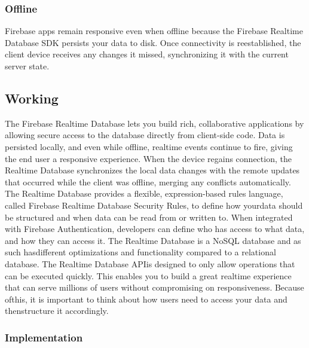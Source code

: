 \subsubsection{Offline}
Firebase apps remain responsive even when offline because the Firebase Realtime Database SDK persists your data to disk. Once connectivity is reestablished, the client device receives any changes it missed, synchronizing it with the current server state.

\subsection{Working}
The Firebase Realtime Database lets you build rich, collaborative applications by allowing secure access to the database directly from client-side code. Data is persisted locally, and even while offline, realtime events continue to fire, giving the end user a responsive experience. When the device regains connection, the Realtime Database synchronizes the local data changes with the remote updates that occurred while the client was offline, merging any conflicts automatically.
The Realtime Database provides a flexible, expression-based rules language, called Firebase Realtime Database Security Rules, to define how yourdata should be structured and when data can be read from or written to. When integrated with Firebase Authentication, developers can define who has access to what data, and how they can access it.
The Realtime Database is a NoSQL database and as such hasdifferent optimizations and functionality compared to a relational database. The Realtime Database APIis designed to only allow operations that can be executed quickly. This enables you to build a great realtime experience that can serve millions of users without compromising on responsiveness. Because ofthis, it is important to think about how users need to access your data and thenstructure it accordingly.

\subsubsection{Implementation}

